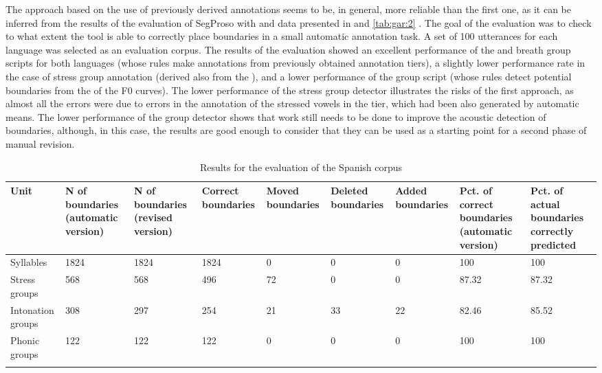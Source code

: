 \documentclass[output=paper]{langsci/langscibook}
\begin{document}
The approach based on the use of previously derived annotations seems to be, in general, more reliable than the first one, as it can be inferred from the results of the evaluation of SegProso with  and  data presented in  and \ref{tab:gar:2} \citep{Garrido2013SegProso}. The goal of the evaluation was to check to what extent the tool is able to correctly place  boundaries in a small automatic annotation task. A set of 100 utterances for each language was selected as an evaluation corpus. The results of the evaluation showed an excellent performance of the  and breath group scripts for both languages (whose rules make annotations from previously obtained annotation tiers), a slightly lower performance rate in the case of stress group annotation (derived also from the ), and a lower performance of the  group script (whose rules detect potential boundaries from the  of the F0 curves). The lower performance of the stress group detector illustrates the risks of the first approach, as almost all the errors were due to errors in the annotation of the stressed vowels in the  tier, which had been also generated by automatic means. The lower performance of the  group detector shows that work still needs to be done to improve the acoustic detection of  boundaries, although, in this case, the results are good enough to consider that they can be used as a starting point for a second phase of manual revision.

\begin{table}\small
\begin{tabularx}{\textwidth}{X QQQQQQQQ}
\lsptoprule
Unit & N of boundaries (automatic version) & N of boundaries (revised version) & Correct boundaries & Moved boundaries & Deleted boundaries & Added boundaries & Pct. of correct boundaries (automatic version) & Pct. of actual boundaries correctly predicted \\
\midrule
Syllables & 1824 & 1824 & 1824 & 0 & 0 & 0 & 100 & 100 \\
\tablevspace
Stress groups & 568 & 568 & 496 & 72 & 0 & 0 & 87.32 & 87.32 \\
\tablevspace
Intonation groups & 308 & 297 & 254 & 21 & 33 & 22 & 82.46 & 85.52 \\
\tablevspace
Phonic groups & 122 & 122 & 122 & 0 & 0 & 0 & 100 & 100 \\
\lspbottomrule
\end{tabularx}
\caption{Results for the evaluation of the Spanish corpus \citep{Garrido2013SegProso}}
\label{tab:gar:1}
\end{table}
\end{document}

